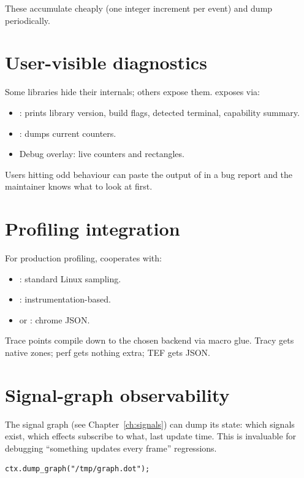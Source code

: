 These accumulate cheaply (one integer increment per event)
and dump periodically.

\section{User-visible diagnostics}

Some libraries hide their internals; others expose them. \maya{}
exposes via:

\begin{itemize}[leftmargin=*]
  \item {}: prints library version, build
    flags, detected terminal, capability summary.
  \item {}: dumps current counters.
  \item Debug overlay: live counters and rectangles.
\end{itemize}

Users hitting odd behaviour can paste the output of
 in a bug report and the maintainer knows
what to look at first.

\section{Profiling integration}

For production profiling, \maya{} cooperates with:

\begin{itemize}[leftmargin=*]
  \item {}: standard Linux sampling.
  \item {}: instrumentation-based.
  \item {} or : chrome
    JSON.
\end{itemize}

Trace points compile down to the chosen backend via macro
glue. Tracy gets native zones; perf gets nothing extra; TEF
gets JSON.

\section{Signal-graph observability}

The signal graph (see Chapter~\ref{ch:signals}) can dump its
state: which signals exist, which effects subscribe to what,
last update time. This is invaluable for debugging
``something updates every frame'' regressions.

\begin{lstlisting}
ctx.dump_graph("/tmp/graph.dot");
\end{lstlisting}

